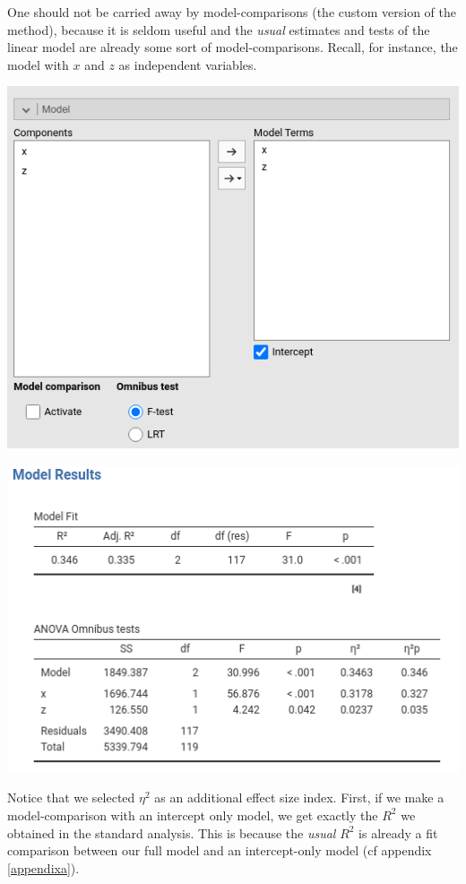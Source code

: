 \documentclass[
]{book}
\begin{document}
One should not be carried away by model-comparisons (the custom version of the method), because it is seldom useful and the \emph{usual} estimates and tests of the linear model are already some sort of model-comparisons. Recall, for instance, the model with \(x\) and \(z\) as independent variables.

\includegraphics[width=7.76in]{bookletpics/2_modelcomparison_input4}

\includegraphics[width=7.08in]{bookletpics/2_modelcomparison_output4}

Notice that we selected \(\eta^2\) as an additional effect size index. First, if we make a model-comparison with an intercept only model, we get exactly the \(R^2\) we obtained in the standard analysis. This is because the \emph{usual} \(R^2\) is already a fit comparison between our full model and an intercept-only model (cf appendix \ref{appendixa}).
\end{document}
